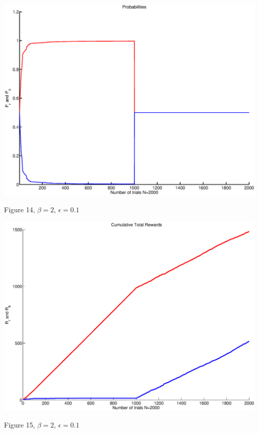 \documentclass{article}
\begin{document}
\begin{center}
\includegraphics[width=\textwidth]{d_prob1.eps}
\begin{footnotesize}
 Figure 14, $\beta=2$, $\epsilon=0.1$
\end{footnotesize}
\end{center}

\begin{center}
\includegraphics[width=\textwidth]{d_rew1.eps}
\begin{footnotesize}
 Figure 15, $\beta=2$, $\epsilon=0.1$
\end{footnotesize}
\end{center}
\end{document}

